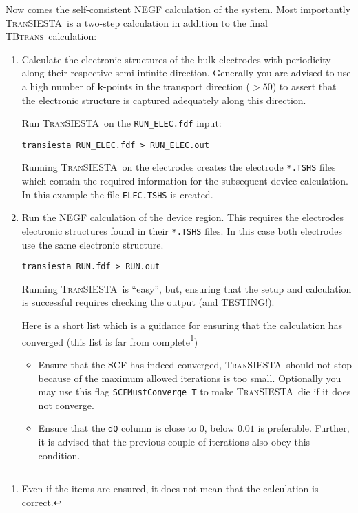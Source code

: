 \documentclass[10pt]{article}
\newcommand\tbt{\textsc{TBtrans}}
\newcommand\ts{\textsc{TranSIESTA}}
\newcommand\script[1]{\texttt{#1}}
\newcounter{example}
\begin{document}
Now comes the self-consistent NEGF calculation of the system.
%
Most importantly \ts\ is a two-step calculation in addition to the final \tbt\
calculation:
\begin{enumerate}

  \item%
  Calculate the electronic structures of the bulk electrodes with periodicity along their
  respective semi-infinite direction. Generally you are advised to use a high number of
  $\mathbf k$-points in the transport direction ($>50$) to assert that the electronic
  structure is captured adequately along this direction.

  Run \ts\ on the \script{RUN\_ELEC.fdf} input:
  \begin{center}
    \script{transiesta RUN\_ELEC.fdf > RUN\_ELEC.out}
  \end{center}
  Running \ts\ on the electrodes creates the electrode \script{*.TSHS} files which contain
  the required information for the subsequent device calculation.
  In this example the file \script{ELEC.TSHS} is created.

  \item%
  Run the NEGF calculation of the device region. This requires the electrodes electronic
  structures found in their \script{*.TSHS} files. In this case both electrodes use the
  same electronic structure.
  \begin{center}
    \script{transiesta RUN.fdf > RUN.out}
  \end{center}
  Running \ts\ is ``easy'', but, ensuring that the setup and calculation is successful
  requires checking the output (and TESTING!).
  
  Here is a short list which is a guidance for ensuring that the calculation has converged
  (this list is far from complete\footnote{Even if the items are ensured, it does not mean
      that the calculation is correct.})
  \begin{itemize}
    \item%
    Ensure that the SCF has indeed converged, \ts\ should not stop because of the maximum
    allowed iterations is too small. Optionally you may use this flag
    \script{SCFMustConverge T} to make \ts\ die if it does not converge.

    \item%
    Ensure that the \script{dQ} column is close to $0$, below $0.01$ is preferable.
    Further, it is advised that the previous couple of iterations also obey this
    condition. 


\end{itemize}
\end{enumerate}
\end{document}
